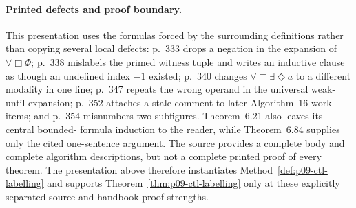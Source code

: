 \paragraph{Printed defects and proof boundary.}
This presentation uses the formulas forced by the surrounding definitions
rather than copying several local defects: p.~333 drops a negation in the
expansion of \(\forall\Box\Phi\); p.~338 mislabels the primed witness tuple
and writes an inductive clause as though an undefined index \(-1\) existed; p.~340
changes \(\forall\Box\exists\Diamond a\) to a different modality in one
line; p.~347 repeats the wrong operand in the universal weak-until expansion;
p.~352 attaches a stale comment to later Algorithm~16 work items; and p.~354
misnumbers two subfigures.  Theorem~6.21 also leaves its central bounded-
formula induction to the reader, while Theorem~6.84 supplies only the cited
one-sentence argument.  The source provides a complete body and complete
algorithm descriptions, but not a complete printed proof of every theorem.
The presentation above therefore instantiates
Method~\ref{def:p09-ctl-labelling} and supports
Theorem~\ref{thm:p09-ctl-labelling} only at these explicitly separated source
and handbook-proof strengths.
